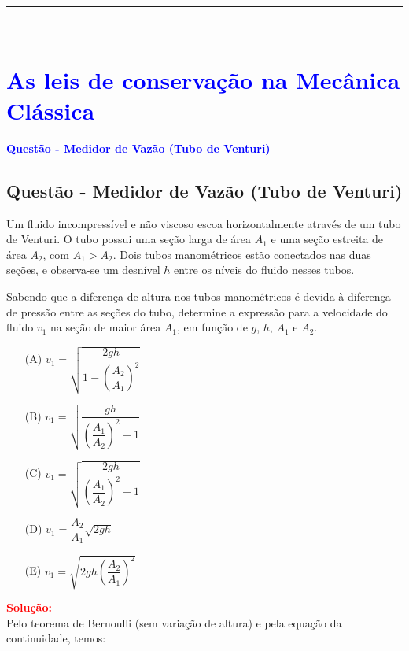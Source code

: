 \noindent\rule{\linewidth}{0.6pt}\\

\section{\large \textcolor{blue}{As leis de conservação na Mecânica Clássica}}

\begin{flushleft}
\textbf{\textcolor{blue}{\Large Quest\~ao - Medidor de Vazão (Tubo de Venturi)}}\\
\noindent

\subsection{Quest\~ao - Medidor de Vazão (Tubo de Venturi)}

Um fluido incompressível e não viscoso escoa horizontalmente através de um tubo de Venturi. O tubo possui uma seção larga de área \( A_1 \) e uma seção estreita de área \( A_2 \), com \( A_1 > A_2 \). Dois tubos manométricos estão conectados nas duas seções, e observa-se um desnível \( h \) entre os níveis do fluido nesses tubos.

Sabendo que a diferença de altura nos tubos manométricos é devida à diferença de pressão entre as seções do tubo, determine a expressão para a velocidade do fluido \( v_1 \) na seção de maior área \( A_1 \), em função de \( g \), \( h \), \( A_1 \) e \( A_2 \).



\begin{itemize}
\item[(A)] \( v_1 = \sqrt{ \dfrac{2gh}{1 - \left( \dfrac{A_2}{A_1} \right)^2} } \)
\item[(B)] \( v_1 = \sqrt{ \dfrac{gh}{\left( \dfrac{A_1}{A_2} \right)^2 - 1} } \)
\item[(C)] \( v_1 = \sqrt{ \dfrac{2gh}{\left( \dfrac{A_1}{A_2} \right)^2 - 1} } \)
\item[(D)] \( v_1 = \dfrac{A_2}{A_1} \sqrt{ 2gh } \)
\item[(E)] \( v_1 = \sqrt{ 2gh \left( \dfrac{A_2}{A_1} \right)^2 } \)
\end{itemize}

\vspace{0.5cm}

\textcolor{red}{\textbf{Solução:}}\\

Pelo teorema de Bernoulli (sem variação de altura) e pela equação da continuidade, temos:


\end{flushleft}
